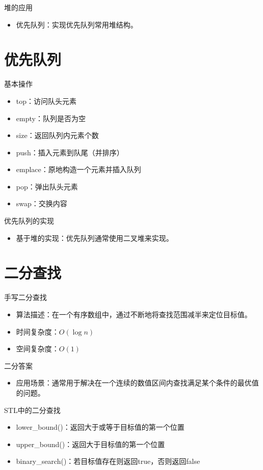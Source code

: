 \documentclass{beamer}
\begin{document}
\begin{frame}{堆的应用}
    \begin{itemize}
        \item 优先队列：实现优先队列常用堆结构。
    \end{itemize}
\end{frame}

\section{优先队列}

\begin{frame}{基本操作}
    \begin{itemize}
        \item top：访问队头元素
        \item empty：队列是否为空
        \item size：返回队列内元素个数
        \item push：插入元素到队尾（并排序）
        \item emplace：原地构造一个元素并插入队列
        \item pop：弹出队头元素
        \item swap：交换内容
    \end{itemize}
\end{frame}

\begin{frame}{优先队列的实现}
    \begin{itemize}
        \item 基于堆的实现：优先队列通常使用二叉堆来实现。
    \end{itemize}
\end{frame}

\section{二分查找}

\begin{frame}{手写二分查找}
    \begin{itemize}
        \item 算法描述：在一个有序数组中，通过不断地将查找范围减半来定位目标值。
        \item 时间复杂度：$O(\log n)$
        \item 空间复杂度：$O(1)$
    \end{itemize}
\end{frame}

\begin{frame}{二分答案}
    \begin{itemize}
        \item 应用场景：通常用于解决在一个连续的数值区间内查找满足某个条件的最优值的问题。
    \end{itemize}
\end{frame}

\begin{frame}{STL中的二分查找}
    \begin{itemize}
        \item lower\_bound()：返回大于或等于目标值的第一个位置
        \item upper\_bound()：返回大于目标值的第一个位置
        \item binary\_search()：若目标值存在则返回true，否则返回false
    \end{itemize}
\end{frame}
\end{document}
